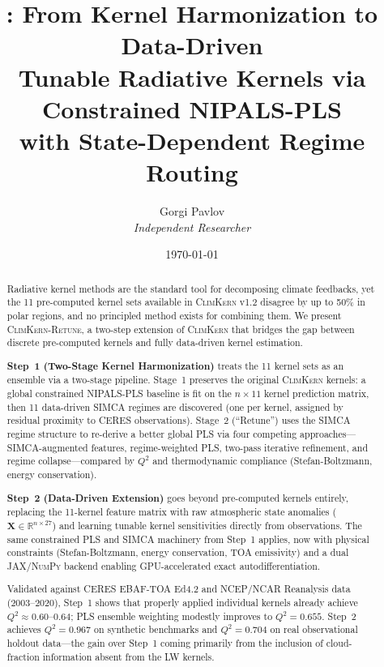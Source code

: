 \documentclass[11pt]{article}
\title{%
  \climkern{}: From Kernel Harmonization to Data-Driven \\
  Tunable Radiative Kernels via Constrained NIPALS-PLS \\
  with State-Dependent Regime Routing%
}
\author{
  Gorgi Pavlov \\[6pt]
  \textit{Independent Researcher}
}
\date{\today}
\newcommand{\Qsq}{Q^{2}}
\newcommand{\climkern}{\textsc{ClimKern-Retune}}
\newcommand{\oldsystem}{\textsc{ClimKern}}
\newcommand{\jax}{\textsc{JAX}}
\newcommand{\numpy}{\textsc{NumPy}}
\begin{document}
\maketitle

\begin{abstract}
Radiative kernel methods are the standard tool for decomposing
climate feedbacks, yet the 11 pre-computed kernel sets available
in \oldsystem{} v1.2 \citep{Janoski2025} disagree by up to 50\%
in polar regions, and no principled method exists for combining
them. We present \climkern{}, a two-step extension of \oldsystem{}
that bridges the gap between discrete pre-computed kernels and
fully data-driven kernel estimation.

\textbf{Step~1 (Two-Stage Kernel Harmonization)} treats the 11
kernel sets as an ensemble via a two-stage pipeline. Stage~1
preserves the original \oldsystem{} kernels: a global
constrained NIPALS-PLS baseline is fit on the $n \times 11$
kernel prediction matrix, then 11 data-driven SIMCA regimes
are discovered (one per kernel, assigned by residual proximity
to CERES observations). Stage~2 (``Retune'') uses the SIMCA
regime structure to re-derive a better global PLS via four
competing approaches---SIMCA-augmented features, regime-weighted
PLS, two-pass iterative refinement, and regime
collapse---compared by $\Qsq$ and thermodynamic compliance
(Stefan-Boltzmann, energy conservation).

\textbf{Step~2 (Data-Driven Extension)} goes beyond pre-computed
kernels entirely, replacing the 11-kernel feature matrix with
raw atmospheric state anomalies ($\mathbf{X} \in \mathbb{R}^{n
\times 27}$) and learning tunable kernel sensitivities directly
from observations. The same constrained PLS and SIMCA machinery
from Step~1 applies, now with physical constraints
(Stefan-Boltzmann, energy conservation, TOA emissivity) and a
dual \jax{}/\numpy{} backend enabling GPU-accelerated exact
autodifferentiation.

Validated against CERES EBAF-TOA Ed4.2 and NCEP/NCAR Reanalysis
data (2003--2020), Step~1 shows that properly applied individual
kernels already achieve $\Qsq \approx 0.60$--$0.64$; PLS
ensemble weighting modestly improves to $\Qsq = 0.655$.
Step~2 achieves $\Qsq = 0.967$
on synthetic benchmarks and $\Qsq = 0.704$ on real observational
holdout data---the gain over Step~1 coming primarily from the
inclusion of cloud-fraction information absent from the LW kernels.
\end{abstract}
\end{document}
